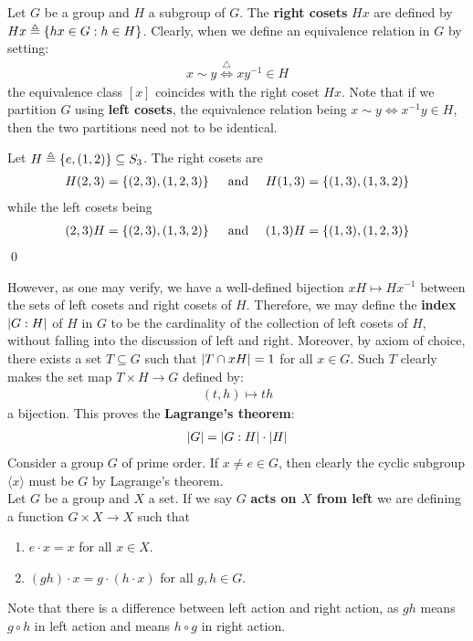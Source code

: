 \documentclass{report}
\begin{document}
Let $G$ be a group and $H$ a subgroup of $G$. The \textbf{right cosets} $Hx$ are defined by $Hx\triangleq \left\{ hx \in G: h \in H \right\}$. Clearly, when we define an equivalence relation in $G$ by setting: 
\begin{align*}
x\sim  y \overset{\triangle}{\iff } xy^{-1} \in H
\end{align*}
the equivalence class $[x]$ coincides with the right coset $Hx$. Note that if we partition $G$ using \textbf{left cosets}, the equivalence relation being $x\sim  y \iff  x^{-1}y\in H$, then the two partitions need not to be identical. 
\begin{example}
Let $H\triangleq \left\{ e,(1,2) \right\}\subseteq S_3$. The right cosets are 
\begin{align*}
H(2,3)=\left\{ (2,3),(1,2,3) \right\}\quad \text{ and }\quad  H(1,3)=\left\{ (1,3),(1,3,2) \right\}
\end{align*}
while the left cosets being
\begin{align*}
(2,3)H= \left\{ (2,3),(1,3,2) \right\} \quad \text{ and }\quad (1,3)H= \left\{ (1,3),(1,2,3) \right\}
\end{align*}
\qed
\end{example}
However, as one may verify, we have a well-defined bijection $xH\mapsto Hx^{-1}$ between the sets of left cosets and right cosets of $H$. Therefore, we may define the \textbf{index} $\left|G:H\right|$ of $H$ in  $G$ to be the cardinality of the collection of left cosets of $H$, without falling into the discussion of left and right. Moreover, by axiom of choice, there exists a set $T\subseteq G$ such that $\left|T\cap xH\right|=1$ for all $x \in G$. Such $T$ clearly makes the set map  $T \times H \rightarrow G$ defined by: 
\begin{align*}
  (t,h)\mapsto th
\end{align*}
a bijection. This proves the \textbf{Lagrange's theorem}: 
\begin{align*}
\left|G\right|= \left|G:H\right| \cdot \left|H\right|
\end{align*}
Consider a group $G$ of prime order. If $x \neq e\in G$, then clearly the cyclic subgroup $\langle x\rangle $ must be $G$ by Lagrange's theorem.  \\


Let $G$ be a group and $X$ a set. If we say  $G$ \textbf{acts on $X$ from left} we are defining a function $G \times X\rightarrow X$ such that 
\begin{enumerate}[label=(\roman*)]
  \item $e\cdot x=x$ for all $x\in X$. 
  \item $(gh)\cdot x= g \cdot (h \cdot x)$ for all $g,h \in G$. 
\end{enumerate}
Note that there is a difference between left action and right action, as $gh$ means $g \circ h$ in left action and means $h \circ g$ in right action. \\
\end{document}
